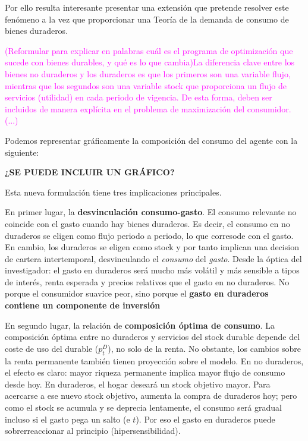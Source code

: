 \documentclass[10pt,a4paper]{article}
\begin{document}
Por ello resulta interesante presentar una extensión que pretende resolver este fenómeno a la vez que proporcionar una Teoría de la demanda de consumo de bienes duraderos. 

\textcolor{magenta}{(Reformular para explicar en palabras cuál es el programa de optimización que sucede con bienes durables, y qué es lo que cambia)La diferencia clave entre los bienes no duraderos y los duraderos es que los primeros son una variable flujo, mientras que los segundos son una variable stock que proporciona un flujo de servicios (utilidad) en cada periodo de vigencia. De esta forma, deben ser incluidos de manera explícita en el problema de maximización del consumidor. (...)}

Podemos representar gráficamente la composición del consumo del agente con la siguiente:

\textbf{¿SE PUEDE INCLUIR UN GRÁFICO?}

Esta nueva formulación tiene tres implicaciones principales.

En primer lugar, la \textbf{desvinculación consumo-gasto}. El consumo relevante no coincide con el gasto cuando hay bienes duraderos. Es decir, el consumo en no duraderos se eligen como flujo periodo a periodo, lo que corresode con el gasto. En cambio, los duraderos se eligen como stock y por tanto implican una decision de cartera intertemporal, desvinculando el \textit{consumo} del \textit{gasto}. Desde la óptica del investigador: el gasto en duraderos será mucho más volátil y más sensible a tipos de interés, renta esperada y precios relativos que el gasto en no duraderos. No porque el consumidor suavice peor, sino porque el \textbf{gasto en duraderos contiene un componente de inversión}

En segundo lugar, la relación de \textbf{composición óptima de consumo}. La composición óptima entre no duraderos y servicios del stock durable depende del coste de uso del durable ($p_t^D$), no solo de la renta. No obstante, los cambios sobre la renta permanente también tienen proyección sobre el modelo. En no duraderos, el efecto es claro: mayor riqueza permanente implica mayor flujo de consumo desde hoy. En duraderos, el hogar deseará un stock objetivo mayor. Para acercarse a ese nuevo stock objetivo, aumenta la compra de duraderos hoy; pero como el stock se acumula y se deprecia lentamente, el consumo será gradual incluso si el gasto pega un salto (e $t$). Por eso el gasto en duraderos puede sobrerreaccionar al principio (hipersensibilidad).
\end{document}
